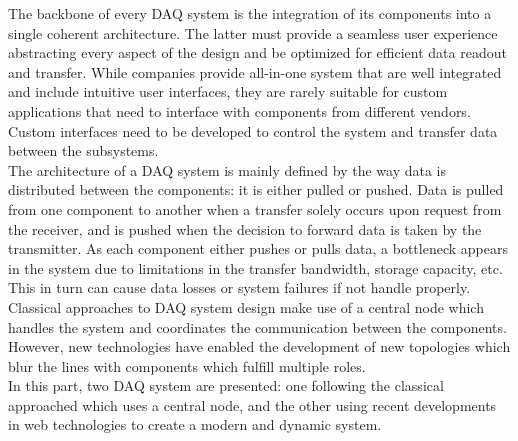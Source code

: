 The backbone of every DAQ system is the integration of its components into a single coherent architecture. The latter must provide a seamless user experience abstracting every aspect of the design and be optimized for efficient data readout and transfer. While companies provide all-in-one system that are well integrated and include intuitive user interfaces, they are rarely suitable for custom applications that need to interface with components from different vendors. Custom interfaces need to be developed to control the system and transfer data between the subsystems. \\

The architecture of a DAQ system is mainly defined by the way data is distributed between the components: it is either pulled or pushed. Data is pulled from one component to another when a transfer solely occurs upon request from the receiver, and is pushed when the decision to forward data is taken by the transmitter. As each component either pushes or pulls data, a bottleneck appears in the system due to limitations in the transfer bandwidth, storage capacity, etc. This in turn can cause data losses or system failures if not handle properly. Classical approaches to DAQ system design make use of a central node which handles the system and coordinates the communication between the components. However, new technologies have enabled the development of new topologies which blur the lines with components which fulfill multiple roles. \\

In this part, two DAQ system are presented: one following the classical approached which uses a central node, and the other using recent developments in web technologies to create a modern and dynamic system.
